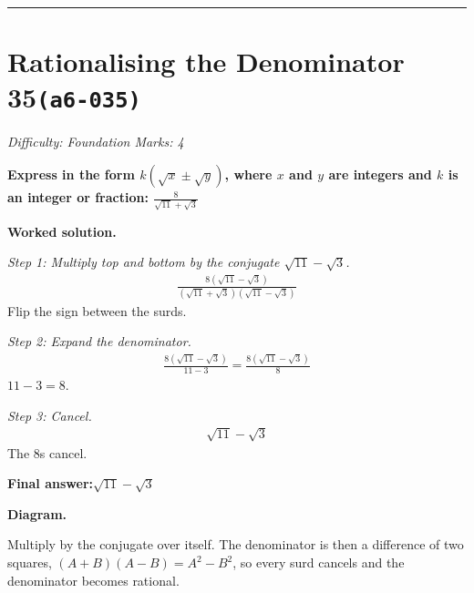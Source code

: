 \documentclass[11pt]{article}
\newcommand{\question}[1]{\par\medskip\noindent\textbf{#1}\par}
\begin{document}
\medskip\hrule

\section*{Rationalising the Denominator 35\quad\small\texttt{(a6-035)}}
\textit{Difficulty: Foundation \quad\textbar\quad Marks: 4}

\question{Express in the form \( k(\sqrt{x} \pm \sqrt{y}) \), where \( x \) and \( y \) are integers and \( k \) is an integer or fraction: \( \frac{8}{\sqrt{11} + \sqrt{3}} \)}

\textbf{Worked solution.}

\textit{Step 1: Multiply top and bottom by the conjugate \( \sqrt{11} - \sqrt{3} \).}
\[\begin{gathered}
\frac{8(\sqrt{11} - \sqrt{3})}{(\sqrt{11} + \sqrt{3})(\sqrt{11} - \sqrt{3})}
\end{gathered}\]
Flip the sign between the surds.

\textit{Step 2: Expand the denominator.}
\[\begin{gathered}
\frac{8(\sqrt{11} - \sqrt{3})}{11 - 3} = \frac{8(\sqrt{11} - \sqrt{3})}{8}
\end{gathered}\]
\( 11 - 3 = 8 \).

\textit{Step 3: Cancel.}
\[\begin{gathered}
\sqrt{11} - \sqrt{3}
\end{gathered}\]
The 8s cancel.

\begin{answerbox}
\textbf{Final answer:}\quad \(\displaystyle \sqrt{11} - \sqrt{3}\)
\end{answerbox}
\textbf{Diagram.}

\begin{center}
\end{center}
\small Multiply by the conjugate over itself. The denominator is then a difference of two squares, $(A+B)(A-B)=A^{2}-B^{2}$, so every surd cancels and the denominator becomes rational.\normalsize
\end{document}
